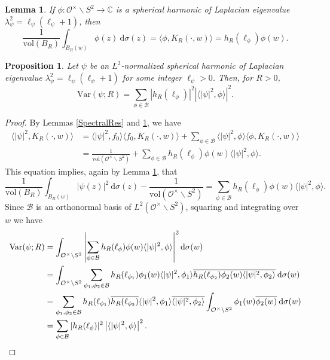 \documentclass[10pt,a4paper]{amsart}
\newtheorem{lemma}{Lemma}
\newtheorem{proposition}{Proposition}
\begin{document}
\begin{lemma}\label{IntBallEqualInnerProd}
If $\phi : \mathcal{O}^{\times} \backslash S^2 \rightarrow \mathbb{C}$ is a spherical harmonic of Laplacian eigenvalue $\lambda_{\psi}^2 = \ell_{\psi}(\ell_{\psi}+1)$, then $$ \frac{1}{\mathrm{vol}(B_R)} \int_{B_R(w)} \phi(z) \: \mathrm{d}\sigma(z) = \langle \phi, K_R(\cdot, w) \rangle = h_R(\ell_{\phi}) \phi(w).$$
\end{lemma}

\begin{proposition}\label{VarianceFormula}
Let $\psi$ be an $L^2$-normalized spherical harmonic of Laplacian eigenvalue $\lambda_{\psi}^2 = \ell_{\psi}(\ell_{\psi}+1)$ for some integer $\ell_{\psi}>0$. Then, for $R>0$, $$\mathrm{Var}(\psi;R) = \sum_{\phi \in \mathcal{B}} |h_R(\ell_{\phi})|^2 \left| \langle |\psi|^2, \phi \rangle \right|^2.$$
\end{proposition}

\begin{proof}
By Lemmas \ref{SpectralRes} and \ref{IntBallEqualInnerProd}, we have 
\begin{align*}
    \langle |\psi|^2, K_R(\cdot, w) \rangle &= \langle |\psi|^2, f_0\rangle \langle f_0, K_R(\cdot, w)\rangle + \sum_{\phi \in \mathcal{B}} \langle |\psi|^2, \phi\rangle \langle \phi, K_R(\cdot, w)\rangle \\
    &= \frac{1}{\mathrm{vol}(\mathcal{O}^{\times} \backslash S^2 )} + \sum_{\phi \in \mathcal{B}} h_R(\ell_{\phi}) \phi(w) \langle |\psi|^2 , \phi \rangle.
\end{align*}
This equation implies, again by Lemma \ref{IntBallEqualInnerProd}, that $$ \frac{1}{\mathrm{vol}(B_R)} \int_{B_R(w)} |\psi(z)|^2 \: \mathrm{d}\sigma(z) - \frac{1}{\mathrm{vol}(\mathcal{O}^{\times} \backslash S^2)} = \sum_{\phi \in \mathcal{B}} h_R(\ell_{\phi}) \phi(w) \langle |\psi|^2 , \phi \rangle.$$ Since $\mathcal{B}$ is an orthonormal basis of $L^2(\mathcal{O}^{\times} \backslash S^2)$, squaring and integrating over $w$ we have
\begin{align*}
    \mathrm{Var}(\psi;R) &= \int_{\mathcal{O}^{\times} \backslash S^2} \left| \sum_{\phi \in \mathcal{B}} h_R(\ell_{\phi}) \phi(w) \langle |\psi|^2 , \phi \rangle \right|^2 \mathrm{d}\sigma(w) \\
    &= \int_{\mathcal{O}^{\times} \backslash S^2} \sum_{\phi_1, \phi_2 \in \mathcal{B}} h_R(\ell_{\phi_1}) \phi_1(w) \langle |\psi|^2 , \phi_1 \rangle \overline{h_R(\ell_{\phi_2}) \phi_2(w) \langle |\psi|^2 , \phi_2 \rangle} \: \mathrm{d}\sigma(w) \\
    &= \sum_{\phi_1, \phi_2 \in \mathcal{B}} h_R(\ell_{\phi_1}) \overline{h_R(\ell_{\phi_2})}  \langle |\psi|^2 , \phi_1 \rangle \overline{\langle |\psi|^2 , \phi_2 \rangle} \int_{\mathcal{O}^{\times} \backslash S^2} \phi_1(w) \overline{\phi_2(w)} \: \mathrm{d}\sigma(w) \\
    &= \sum_{\phi \in \mathcal{B}} |h_R(\ell_{\phi})|^2 \left| \langle |\psi|^2, \phi \rangle \right|^2. \qedhere
\end{align*}
\end{proof}
\end{document}
